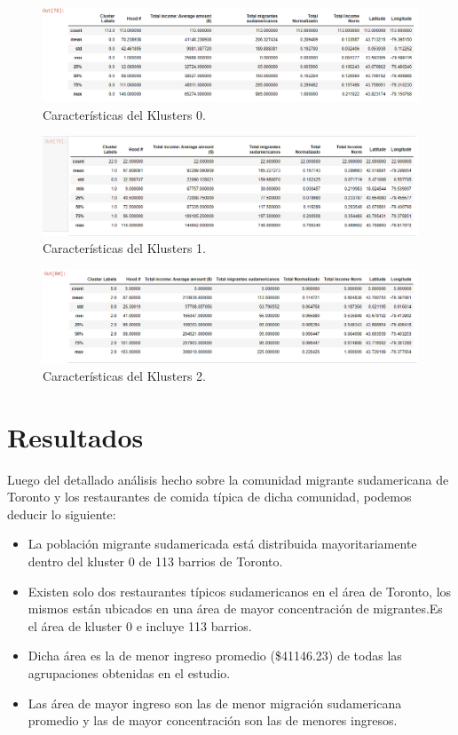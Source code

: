 \documentclass[10pt,a4paper,arial, spanish]{article}
\begin{document}
\begin{figure}[H]
	\centering
	\includegraphics[scale=0.45]{df8}
	\caption[Características del Klusters 0.]{Características del Klusters 0.}
	\label{fig:df8}
\end{figure}
\begin{figure}[H]
	\centering
	\includegraphics[scale=0.45]{df9}
	\caption[Características del Klusters 1.]{Características del Klusters 1.}
	\label{fig:df9}
\end{figure}
\begin{figure}[H]
	\centering
	\includegraphics[scale=0.45]{df10}
	\caption[Características del Klusters 2.]{Características del Klusters 2.}
	\label{fig:df10}
\end{figure}

\section{Resultados}
Luego del detallado análisis hecho sobre la comunidad migrante sudamericana de Toronto y los restaurantes de comida típica de dicha comunidad, podemos deducir lo siguiente:
\begin{itemize}
	\item La población migrante sudamericada está distribuida mayoritariamente dentro del kluster 0 de 113 barrios de Toronto.
	\item Existen solo dos restaurantes típicos sudamericanos en el área de Toronto, los mismos están ubicados en una área de mayor concentración de migrantes.Es el área de kluster 0 e incluye 113 barrios.
	\item Dicha área es la de menor ingreso promedio (\$41146.23) de todas las agrupaciones obtenidas en el estudio.
	\item Las área de mayor ingreso son las de menor migración sudamericana promedio y las de mayor concentración son las de menores ingresos.
\end{itemize} 
\end{document}
